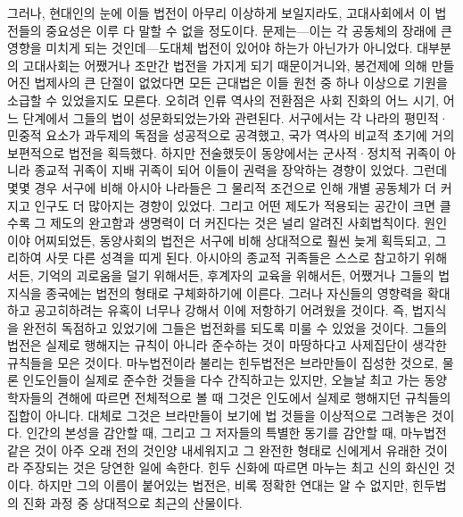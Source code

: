 그러나, 현대인의 눈에 이들 법전이 아무리 이상하게 보일지라도,
고대사회에서 이 법전들의 중요성은 이루 다 말할 수 없을 정도이다.
문제는---이는 각 공동체의 장래에 큰 영향을 미치게 되는 것인데---도대체
법전이 있어야 하는가 아닌가가 아니었다.
대부분의 고대사회는 어쨌거나 조만간 법전을 가지게 되기 때문이거니와,
봉건제에 의해 만들어진 법제사의 큰 단절이 없었다면
모든 근대법은 이들 원천 중 하나 이상으로
기원을 소급할 수 있었을지도 모른다.
오히려 인류 역사의 전환점은
사회 진화의 어느 시기, 어느 단계에서 그들의 법이 성문화되었는가와 관련된다.
서구에서는 각 나라의 평민적^^b7민중적 요소가 과두제의 독점을 성공적으로
공격했고, 국가 역사의 비교적 초기에 거의 보편적으로 법전을 획득했다.
하지만 전술했듯이 동양에서는 군사적^^b7정치적 귀족이 아니라
종교적 귀족이 지배 귀족이 되어 이들이 권력을 장악하는 경향이 있었다.
그런데 몇몇 경우 서구에 비해 아시아 나라들은 그 물리적 조건으로 인해
개별 공동체가 더 커지고 인구도 더 많아지는 경향이 있었다.
그리고 어떤 제도가 적용되는 공간이 크면 클수록
그 제도의 완고함과 생명력이 더 커진다는 것은 널리 알려진 사회법칙이다.
원인이야 어찌되었든, 동양사회의 법전은 서구에 비해
상대적으로 훨씬 늦게 획득되고, 그리하여 사뭇 다른 성격을 띠게 된다.
아시아의 종교적 귀족들은 스스로 참고하기 위해서든, 기억의 괴로움을
덜기 위해서든, 후계자의 교육을 위해서든, 어쨌거나
그들의 법지식을 종국에는 법전의 형태로 구체화하기에 이른다.
그러나 자신들의 영향력을 확대하고 공고히하려는 유혹이 너무나 강해서
이에 저항하기 어려웠을 것이다. 즉,
법지식을 완전히 독점하고 있었기에 그들은
법전화를 되도록 미룰 수 있었을 것이다.
그들의 법전은 실제로 행해지는 규칙이 아니라
준수하는 것이 마땅하다고 사제집단이 생각한 규칙들을 모은 것이다.
마누법전이라 불리는 힌두법전은 브라만들이 집성한 것으로,
물론 인도인들이 실제로 준수한 것들을 다수 간직하고는 있지만,
오늘날 최고 가는 동양학자들의 견해에 따르면
전체적으로 볼 때 그것은 인도에서 실제로 행해지던 규칙들의 집합이 아니다.
대체로 그것은 브라만들이 보기에 법 것들을
이상적으로 그려놓은 것이다.
인간의 본성을 감안할 때, 그리고 그 저자들의 특별한 동기를 감안할 때,
마누법전 같은 것이 아주 오래 전의 것인양 내세워지고
그 완전한 형태로 신에게서 유래한 것이라 주장되는 것은 당연한 일에 속한다.
힌두 신화에 따르면 마누는 최고 신의 화신인 것이다.
하지만 그의 이름이 붙어있는 법전은, 비록 정확한 연대는 알 수 없지만,
힌두법의 진화 과정 중 상대적으로 최근의 산물이다.


